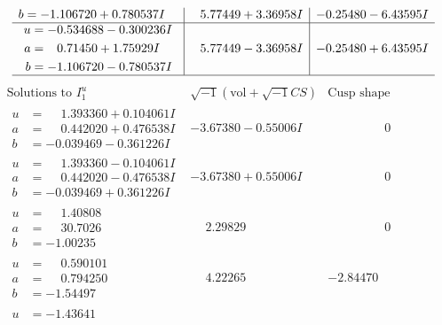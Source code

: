 \documentclass[1p]{elsarticle_modified}
\theoremstyle{definition}
\newcommand{\I}{\sqrt{-1}}
\begin{document}
$$\begin{array}{c|c|c}
\begin{aligned}
b &= -1.106720 + 0.780537 I\end{aligned}
 & \phantom{-}5.77449 + 3.36958 I & -0.25480 - 6.43595 I \\ \hline\begin{aligned}
u &= -0.534688 - 0.300236 I \\
a &= \phantom{-}0.71450 + 1.75929 I \\
b &= -1.106720 - 0.780537 I\end{aligned}
 & \phantom{-}5.77449 - 3.36958 I & -0.25480 + 6.43595 I\\
 \hline 
 \end{array}$$\newpage$$\begin{array}{c|c|c}  
\text{Solutions to }I^u_{1}& \I (\text{vol} + \sqrt{-1}CS) & \text{Cusp shape}\\
 \hline 
\begin{aligned}
u &= \phantom{-}1.393360 + 0.104061 I \\
a &= \phantom{-}0.442020 + 0.476538 I \\
b &= -0.039469 - 0.361226 I\end{aligned}
 & -3.67380 - 0.55006 I & \phantom{-0.000000 } 0 \\ \hline\begin{aligned}
u &= \phantom{-}1.393360 - 0.104061 I \\
a &= \phantom{-}0.442020 - 0.476538 I \\
b &= -0.039469 + 0.361226 I\end{aligned}
 & -3.67380 + 0.55006 I & \phantom{-0.000000 } 0 \\ \hline\begin{aligned}
u &= \phantom{-}1.40808\phantom{ +0.000000I} \\
a &= \phantom{-}30.7026\phantom{ +0.000000I} \\
b &= -1.00235\phantom{ +0.000000I}\end{aligned}
 & \phantom{-}2.29829\phantom{ +0.000000I} & \phantom{-0.000000 } 0 \\ \hline\begin{aligned}
u &= \phantom{-}0.590101\phantom{ +0.000000I} \\
a &= \phantom{-}0.794250\phantom{ +0.000000I} \\
b &= -1.54497\phantom{ +0.000000I}\end{aligned}
 & \phantom{-}4.22265\phantom{ +0.000000I} & -2.84470\phantom{ +0.000000I} \\ \hline\begin{aligned}
u &= -1.43641\phantom{ +0.000000I} \\

\end{aligned}
\end{array}$$
\end{document}
